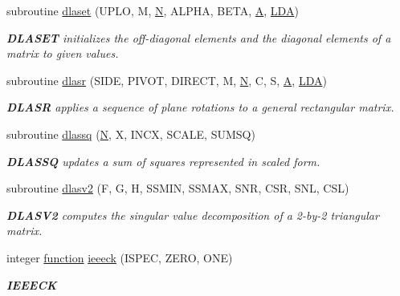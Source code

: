 \begin{DoxyCompactItemize}
subroutine \hyperlink{group__auxOTHERauxiliary_ga89e332374c7cd87e5db54bfe21550bc3}{dlaset} (U\+P\+L\+O, M, \hyperlink{polmisc_8c_a0240ac851181b84ac374872dc5434ee4}{N}, A\+L\+P\+H\+A, B\+E\+T\+A, \hyperlink{classA}{A}, \hyperlink{example__user_8c_ae946da542ce0db94dced19b2ecefd1aa}{L\+D\+A})
\begin{DoxyCompactList}\small\item\em {\bfseries D\+L\+A\+S\+E\+T} initializes the off-\/diagonal elements and the diagonal elements of a matrix to given values. \end{DoxyCompactList}\item 
subroutine \hyperlink{group__auxOTHERauxiliary_gaa0a984d2062d62286a7a78ed3ba06fda}{dlasr} (S\+I\+D\+E, P\+I\+V\+O\+T, D\+I\+R\+E\+C\+T, M, \hyperlink{polmisc_8c_a0240ac851181b84ac374872dc5434ee4}{N}, C, S, \hyperlink{classA}{A}, \hyperlink{example__user_8c_ae946da542ce0db94dced19b2ecefd1aa}{L\+D\+A})
\begin{DoxyCompactList}\small\item\em {\bfseries D\+L\+A\+S\+R} applies a sequence of plane rotations to a general rectangular matrix. \end{DoxyCompactList}\item 
subroutine \hyperlink{group__auxOTHERauxiliary_ga9c824016058563e3b7189801d1de6d58}{dlassq} (\hyperlink{polmisc_8c_a0240ac851181b84ac374872dc5434ee4}{N}, X, I\+N\+C\+X, S\+C\+A\+L\+E, S\+U\+M\+S\+Q)
\begin{DoxyCompactList}\small\item\em {\bfseries D\+L\+A\+S\+S\+Q} updates a sum of squares represented in scaled form. \end{DoxyCompactList}\item 
subroutine \hyperlink{group__auxOTHERauxiliary_gaee8e05a707783a9fba5d213093453543}{dlasv2} (F, G, H, S\+S\+M\+I\+N, S\+S\+M\+A\+X, S\+N\+R, C\+S\+R, S\+N\+L, C\+S\+L)
\begin{DoxyCompactList}\small\item\em {\bfseries D\+L\+A\+S\+V2} computes the singular value decomposition of a 2-\/by-\/2 triangular matrix. \end{DoxyCompactList}\item 
integer \hyperlink{afunc_8m_a7b5e596df91eadea6c537c0825e894a7}{function} \hyperlink{group__auxOTHERauxiliary_ga97715c995b884378afbbff7915d884c5}{ieeeck} (I\+S\+P\+E\+C, Z\+E\+R\+O, O\+N\+E)
\begin{DoxyCompactList}\small\item\em {\bfseries I\+E\+E\+E\+C\+K} \end{DoxyCompactList}\item 

\end{DoxyCompactItemize}
